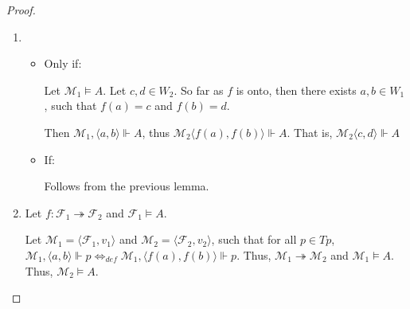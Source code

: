 \documentclass[a4paper]{article}
\theoremstyle{defin}
\theoremstyle{theorem}
\theoremstyle{prop}
\theoremstyle{lemma}
\theoremstyle{ex}
\theoremstyle{col}
\begin{document}
\begin{proof}
$ $

\begin{enumerate}
  \item
  \begin{itemize}
    \item Only if:

    Let $\mathcal{M}_1 \models A$. Let $c, d \in W_2$. So far as $f$ is onto,
    then there exists $a, b \in W_1$, such that $f(a) = c$ and $f(b) = d$.

    Then $\mathcal{M}_1, \langle a, b \rangle \Vdash A$, thus $\mathcal{M}_2 \langle f(a), f(b) \rangle \Vdash A$.
    That is, $\mathcal{M}_2 \langle c, d \rangle \Vdash A$

    \item If:

    Follows from the previous lemma.
  \end{itemize}
  \item Let $f : \mathcal{F}_1 \twoheadrightarrow \mathcal{F}_2$ and $\mathcal{F}_1 \models A$.

  Let $\mathcal{M}_1 = \langle \mathcal{F}_1, v_1 \rangle$ and $\mathcal{M}_2 = \langle \mathcal{F}_2, v_2 \rangle$, such that
  for all $p \in Tp$,
  $\mathcal{M}_1, \langle a, b \rangle \Vdash p \Leftrightarrow_{def} \mathcal{M}_1, \langle f(a), f(b) \rangle \Vdash p$.
  Thus, $\mathcal{M}_1 \twoheadrightarrow \mathcal{M}_2$ and $\mathcal{M}_1 \models A$. Thus, $\mathcal{M}_2 \models A$.
\end{enumerate}
\end{proof}
\end{document}
